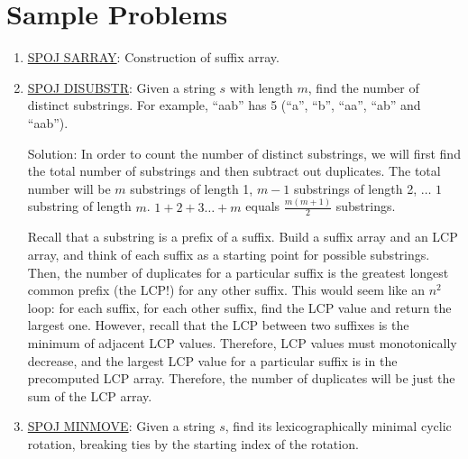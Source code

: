 \documentclass[11pt, oneside]{article}
\begin{document}
\newpage

\section{Sample Problems}

\begin{enumerate}
  \item \href{https://www.spoj.com/problems/SARRAY/}{SPOJ SARRAY}:
  Construction of suffix array.

  \item \href{https://www.spoj.com/problems/DISUBSTR/}{SPOJ DISUBSTR}:
  Given a string \( s \) with length \( m \), find the number of distinct substrings.
  For example, ``aab'' has 5 (``a'', ``b'', ``aa'', ``ab'' and ``aab'').

  Solution: In order to count the number of distinct substrings,
  we will first find the total number of substrings and then subtract out duplicates.
  The total number will be \( m \) substrings of length 1, \( m - 1 \) substrings of length 2,
  \( \dots \) \( 1 \) substring of length \( m \). \( 1 + 2 + 3 \dots + m \) equals
  \( \frac{m(m + 1)}{2} \) substrings.

  Recall that a substring is a prefix of a suffix. Build a suffix array
  and an LCP array, and think of each suffix as a starting point for
  possible substrings. Then, the number of duplicates for a particular suffix is the greatest
  longest common prefix (the LCP!) for any other suffix. This would seem like an \( n^2 \) loop:
  for each suffix, for each other suffix, find the LCP value and return the largest one.
  However, recall that the LCP between two suffixes is the minimum of adjacent LCP values.
  Therefore, LCP values must monotonically decrease, and the largest LCP value for a particular suffix is in the precomputed LCP array. Therefore, the number of duplicates will be just the sum of the LCP array.

  \item \href{https://www.spoj.com/problems/MINMOVE/}{SPOJ MINMOVE}:
  Given a string \( s \), find its lexicographically minimal cyclic \\ rotation,
  breaking ties by the starting index of the rotation.


\end{enumerate}
\end{document}
